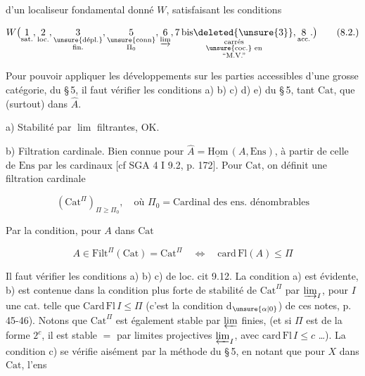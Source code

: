 d'un localiseur fondamental donné $W$, satisfaisant les conditions

\[
W\bigl(\underset{\text{sat.}}{1},\underset{\text{loc.}}{2}, \underset{\substack{\text{\unsure{dépl.}}\\\text{fin.}}}{3}, \underset{\substack{\text{\unsure{conn}}\\\Pi_0}}{5}, \underset{\varinjlim}{6}, \underset{\substack{\text{carrés}\\\text{\unsure{coc.} en}\\\text{``M.V.''}}}{7\,\mathrm{bis}\deleted{\unsure{3}}}, \underset{\text{acc.}}{8}.\bigr)\tag*{(8.2.)}
\]


 Pour pouvoir  appliquer les développements sur les parties accessibles d'une grosse catégorie,  du \S\,5, il faut vérifier les conditions a) b) c) d) e) \deleted{\unsure{\S}} du \S\,5, tant  $\mathrm{Cat}$, que (surtout) dans $\widehat A$.

a) Stabilité par  \uline{$\lim$} filtrantes, OK.

b) Filtration cardinale. Bien connue pour $\widehat A=\underline{\mathrm{Hom}}\,(A,\mathrm{Ens})$, à partir de celle de $\mathrm{Ens}$ par les cardinaux [cf SGA 4 I 9.2, p. 172]. Pour $\mathrm{Cat}$, on définit une filtration cardinale

\[
(\mathrm{Cat}^{\Pi})_{\Pi\geq\Pi_0},\quad\text{où }\Pi_0=\text{Cardinal des ens. dénombrables}\tag*{(8.3)}
\]


Par la condition, pour $A$ dans $\mathrm{Cat}$

\[
A\in\mathrm{Filt}^{\Pi}(\mathrm{Cat})=\mathrm{Cat}^{\Pi}\quad\Longleftrightarrow\quad\mathrm{card}\,\mathrm{Fl}(A)\leq\Pi\tag*{(8.4)}
\]

Il faut vérifier  les conditions a) b) c) de loc. cit 9.12. La condition a) est évidente, b) est contenue dans la condition plus forte de stabilité de $\mathrm{Cat}^{\Pi}$ par $\varinjlim_I$, pour $I$ une cat. telle que $\mathrm{Card}\,\mathrm{Fl}\,I\leq\Pi$ (c'est la condition d$_{\unsure{\alpha|0}}$) de ces notes, p. 45-46). Notons que $\mathrm{Cat}^{\Pi}$ est également stable par $\varprojlim$ finies, (et si $\Pi$ est de la forme $2^c$, il est stable $=$ par limites projectives $\varprojlim_I$, avec $\mathrm{card}\,\mathrm{Fl}\,I\leq c$ \ldots). La condition c) se vérifie aisément par la méthode du \S\,5, en notant que pour $X$ dans $\mathrm{Cat}$, l'ens

